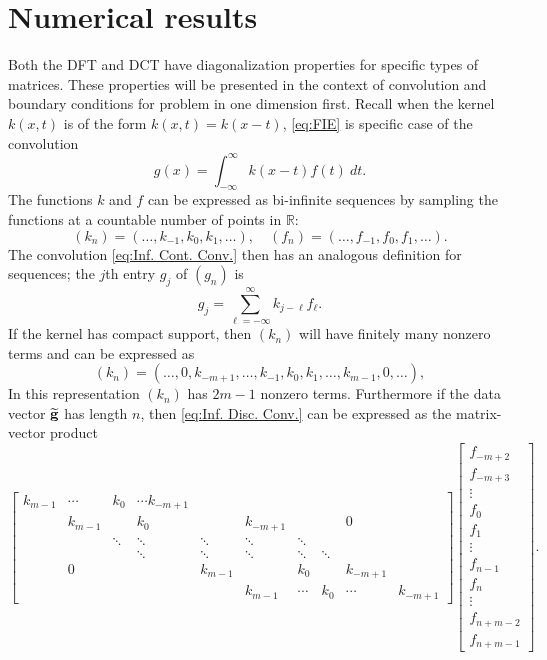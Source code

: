\chapter{Numerical results} \label{ch:Results}
Both the DFT and DCT have diagonalization properties for specific types of matrices. These properties will be presented in the context of convolution and boundary conditions for problem in one dimension first. Recall when the kernel $k(x,t)$ is of the form $k(x,t) = k(x-t)$, \eqref{eq:FIE} is specific case of the convolution
\begin{equation}
\label{eq:Inf. Cont. Conv.}
g(x) = \int_{-\infty}^{\infty} k(x-t)f(t) ~dt.
\end{equation}
The functions $k$ and $f$ can be expressed as bi-infinite sequences by sampling the functions at a countable number of points in $\mathbb{R}$:
\[(k_n) = (\ldots,k_{-1},k_{0},k_{1},\ldots), \quad (f_n) = (\ldots,f_{-1},f_{0},f_{1},\ldots).\]
The convolution \eqref{eq:Inf. Cont. Conv.} then has an analogous definition for sequences; the $j$th entry $g_j$ of $(g_n)$ is
\begin{equation}
\label{eq:Inf. Disc. Conv.}
g_j = \sum_{\ell=-\infty}^{\infty} k_{j-\ell}f_{\ell}.
\end{equation}
If the kernel has compact support, then $(k_n)$ will have finitely many nonzero terms and can be expressed as
\begin{equation}
\label{eq:Kernel seq.}
(k_n) = (\ldots,0,k_{-m+1},\ldots,k_{-1},k_{0},k_{1},\ldots,k_{m-1},0,\ldots),
\end{equation}
In this representation $(k_n)$ has $2m-1$ nonzero terms. Furthermore if the data vector $\widetilde{\mathbf{g}}$ has length $n$, then \eqref{eq:Inf. Disc. Conv.} can be expressed as the matrix-vector product
\begin{equation}
\label{eq:FIEv. Prod.}
\begin{bmatrix}
k_{m-1} & \cdots & k_0 & \cdots k_{-m+1} & & & & & \\
 & k_{m-1} & & k_0 & & k_{-m+1} & & & 0 & \\
 & & \ddots & \ddots & \ddots & \ddots & \ddots & & & \\
 & & & \ddots & \ddots & \ddots & \ddots & \ddots & & \\
 & 0 & & & k_{m-1} & & k_0 & & k_{-m+1} & \\
 & & & & & k_{m-1} & \cdots & k_0 & \cdots & k_{-m+1}
\end{bmatrix}\begin{bmatrix}
f_{-m+2} \\
f_{-m+3} \\
\vdots \\
f_0 \\
f_1 \\
\vdots \\
f_{n-1} \\
f_n \\
\vdots \\
f_{n+m-2} \\
f_{n+m-1}
\end{bmatrix}.
\end{equation}
